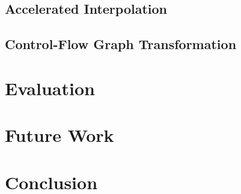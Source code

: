\documentclass[11pt,
a4paper,
parskip=half, %
BCOR=10mm, %
ngerman, english
]{scrbook}
\begin{document}
\section{Accelerated Interpolation}

\label{accelInterpol}

\section{Control-Flow Graph Transformation}

\label{icfgTransformation}

\chapter{Evaluation}
\label{eval}


\chapter{Future Work}
\label{futrWork}


	\setlength{\abovedisplayskip}{0.25cm}
\setlength{\belowdisplayskip}{0.25cm}
\setlength{\abovedisplayshortskip}{0.25cm}
\setlength{\belowdisplayshortskip}{0.25cm}
\chapter{Conclusion}
\label{concl}



\pagebreak



\listoffigures
\end{document}
